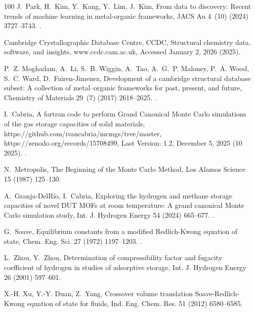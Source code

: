 \documentclass[review]{elsarticle}
\begin{document}
\begin{thebibliography}{100}
J.~Park, H.~Kim, Y.~Kang, Y.~Lim, J.~Kim, From data to discovery: Recent trends
  of machine learning in metal-organic frameworks, JACS Au 4~(10) (2024)
  3727--3743.
\newblock \href {https://doi.org/10.1021/jacsau.4c00618}
  {}.

{Cambridge Crystallographic Database Centre, CCDC}, Structural chemistry data,
  software, and insights, www.ccdc.cam.ac.uk, {Accessed January 2, 2026}
  (2025).

P.~Z. Moghadam, A.~Li, S.~B. Wiggin, A.~Tao, A.~G.~P. Maloney, P.~A. Wood,
  S.~C. Ward, D.~Fairen-Jimenez, Development of a cambridge structural database
  subset: A collection of metal–organic frameworks for past, present, and
  future, Chemistry of Materials 29~(7) (2017) 2618--2625.
\newblock \href {https://doi.org/10.1021/acs.chemmater.7b00441}
  {}.

I.~Cabria, A fortran code to perform {Grand Canonical Monte Carlo} simulations
  of the gas storage capacities of solid materials,
  https://github.com/ivancabria/mcmgs/tree/master,
  https://zenodo.org/records/15708499, {Last Version: 1.2, December 5, 2025}
  (10 2025).
\newblock \href {https://doi.org/10.5281/zenodo.15708498}
  {}.

N.~Metropolis, The {B}eginning of the {M}onte {C}arlo {M}ethod, Los Alamos
  Science 15 (1987) 125--130.

A.~Granja-DelRío, I.~Cabria, Exploring the hydrogen and methane storage
  capacities of novel {DUT} {MOF}s at room temperature: A grand canonical
  {Monte} {Carlo} simulation study, Int. J. Hydrogen Energy 54 (2024) 665--677.
\newblock \href {https://doi.org/10.1016/j.ijhydene.2023.11.258}
  {}.

G.~Soave, Equilibrium constants from a modified {Redlich-Kwong} equation of
  state, Chem. Eng. Sci. 27 (1972) 1197--1203.
\newblock \href {https://doi.org/10.1016/0009-2509(72)80096-4}
  {}.

L.~Zhou, Y.~Zhou, Determination of compressibility factor and fugacity
  coefficient of hydrogen in studies of adsorptive storage, Int. J. Hydrogen
  Energy 26 (2001) 597--601.

X.-H. Xu, Y.-Y. Duan, Z.~Yang, Crossover volume translation
  {Soave-Redlich-Kwong} equation of state for fluids, Ind. Eng. Chem. Res. 51
  (2012) 6580--6585.


\end{thebibliography}
\end{document}
